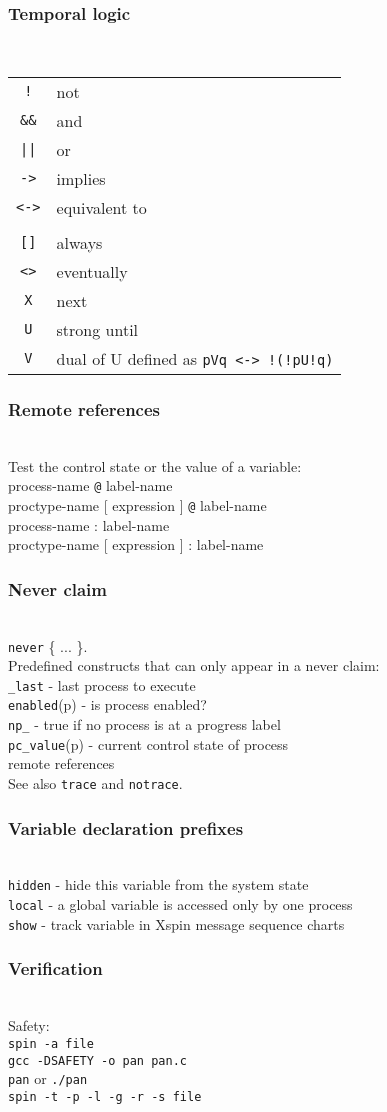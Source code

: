 \documentclass{leaflet}
\newcommand{\sct}[1]{\subsubsection{#1}\mbox{}\\}
\newcommand{\spc}{\hspace*{1.5em}}
\begin{document}
\newpage

\sct{Temporal logic}

\vspace*{-2ex}\spc{}
\begin{tabular}{cl}
\verb+!+ & not\\
\verb+&&+ & and\\
\verb+||+ & or\\
\verb+->+ & implies\\
\verb+<->+ & equivalent to\\
&\\
\verb+[]+ & always\\
\verb+<>+ & eventually\\
\verb+X+ & next\\
\verb+U+ & strong until\\
\verb+V+ & dual of U defined as \verb+pVq <-> !(!pU!q)+
\end{tabular}

\sct{Remote references}
Test the control state or the value of a variable:\\
\spc{}process-name \verb+@+ label-name\\
\spc{}proctype-name [ expression ] \verb+@+ label-name\\
\spc{}process-name  : label-name\\
\spc{}proctype-name [ expression ] : label-name

\sct{Never claim}
\texttt{never} \{ ... \}.\\
Predefined constructs that can only appear in a never claim:\\
\spc{}\texttt{\_last} - last process to execute\\
\spc{}\texttt{enabled}(p) - is process enabled?\\
\spc{}\texttt{np\_} - true if no process is at a progress label\\
\spc{}\texttt{pc\_value}(p) - current control state of process\\
\spc{}remote references\\
See also \texttt{trace} and \texttt{notrace}.

\sct{Variable declaration prefixes}
\texttt{hidden} - hide this variable from the system state\\
\texttt{local} - a global variable is accessed only by one process\\
\texttt{show} - track variable in Xspin message sequence charts

\sct{Verification}
Safety:\\
\spc{}\verb+spin -a file+\\
\spc{}\verb+gcc -DSAFETY -o pan pan.c+\\
\spc{}\verb+pan+ or \verb+./pan+\\
\spc{}\verb+spin -t -p -l -g -r -s file+
\end{document}
